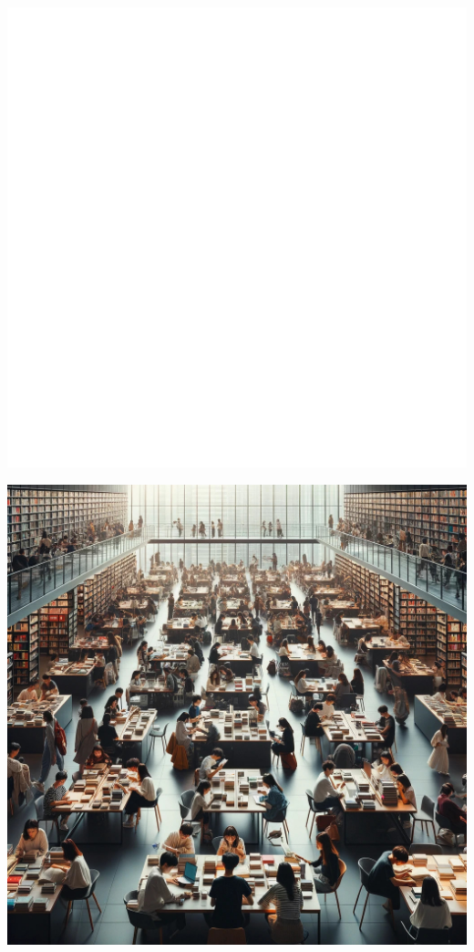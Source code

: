 \documentclass{novel}
\begin{document}
\begin{minipage}{0.33\textwidth}
    \includegraphics[width=1\textwidth]{resources/square.jpg}
\end{minipage}\hfill
\begin{minipage}{0.33\textwidth}
    \includegraphics[width=1\textwidth]{resources/mileEnd.jpg}
\end{minipage}\hfill
\end{document}
